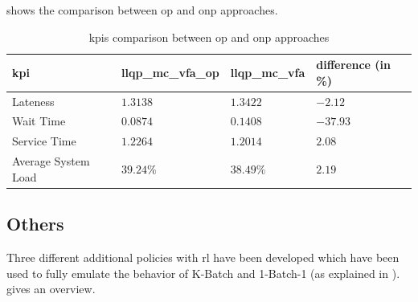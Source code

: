 \documentclass{seal_thesis}
\begin{document}
 shows the comparison between \gls{op} and \gls{onp} approaches.

\begin{table}[!ht]
\centering
\begin{tabular}{@{}llll@{}}
\toprule
\gls{kpi}                 & llqp\_mc\_vfa\_op & llqp\_mc\_vfa & difference (in \%) \\ \midrule
Lateness            & $1.3138$                  & $1.3422$              & $-2.12$                   \\
Wait Time           & $0.0874$                  & $0.1408$              & $-37.93$                   \\
Service Time        & $1.2264$                  & $1.2014$              & $2.08$                   \\
Average System Load & $39.24\%$                  & $38.49\%$              & $2.19$                   \\ \bottomrule
\end{tabular}
\caption{\glspl{kpi} comparison between \gls{op} and \gls{onp} approaches}
\label{tab:llqp_mc_vfa_op_vs_on}
\end{table}

\subsection{Others}
\label{subsec:rl_others}

Three different additional policies with \gls{rl} have been developed which have been used to fully emulate the behavior of K-Batch and 1-Batch-1 (as explained in ).  gives an overview.

\begin{table}[!ht]
\centering
{}
\caption{Overview of additional developed policies with \gls{rl}}
\label{tab:rl_others_policies_overview}
\end{table}
\end{document}

